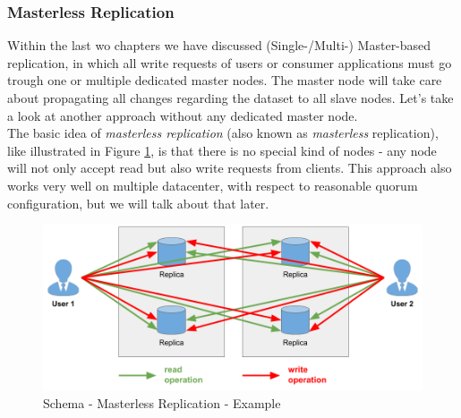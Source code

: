 {\newpage
\subsubsection{Masterless Replication}
\label{tf_dds_replication_masterless}
Within the last wo chapters we have discussed (Single-/Multi-) Master-based replication, in which all write requests of users or consumer applications must go trough one or multiple dedicated master nodes. The master node will take care about propagating all changes regarding the dataset to all slave nodes. Let's take a look at another approach without any dedicated master node. \\
The basic idea of \textit{masterless replication} (also known as \textit{masterless} replication), like illustrated in Figure \ref{schema_replication_ll}, is that there is no special kind of nodes - any node will not only accept read but also write requests from clients. This approach also works very well on multiple datacenter, with respect to reasonable quorum configuration, but we will talk about that later.

\begin{figure}[h]
	\centering
  \includegraphics[width=1\textwidth]{replication_schema_ll.png}
	\caption{Schema - Masterless Replication - Example}
	\label{schema_replication_ll}
\end{figure}

}
